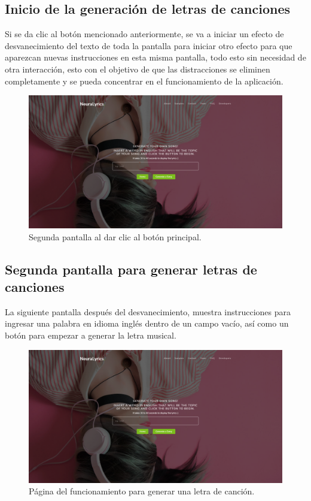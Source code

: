 \documentclass[12pt, a4paper, titlepage]{article}
\begin{document}
	\subsection{Inicio de la generación de letras de canciones}
		Si se da clic al botón mencionado anteriormente, se va a iniciar un efecto de desvanecimiento del texto de toda la pantalla para iniciar otro efecto para que aparezcan nuevas instrucciones en esta misma pantalla, todo esto sin necesidad de otra interacción, esto con el objetivo de que las distracciones se eliminen completamente y se pueda concentrar en el funcionamiento de la aplicación.
		\begin{figure}[H] 
			\includegraphics[width=13.5cm]{./Imagenes/Capturas/pform.png}
			\centering \caption{Segunda pantalla al dar clic al botón principal.}
		\end{figure}
	\subsection{Segunda pantalla para generar letras de canciones}
	La siguiente pantalla después del desvanecimiento, muestra instrucciones para ingresar una palabra en idioma inglés dentro de un campo vacío, así como un botón para empezar a generar la letra musical.
	\begin{figure}[H] 
		\includegraphics[width=13.5cm]{./Imagenes/Capturas/pform.png}
		\centering \caption{Página del funcionamiento para generar una letra de canción.}
	\end{figure}
	
\end{document}
